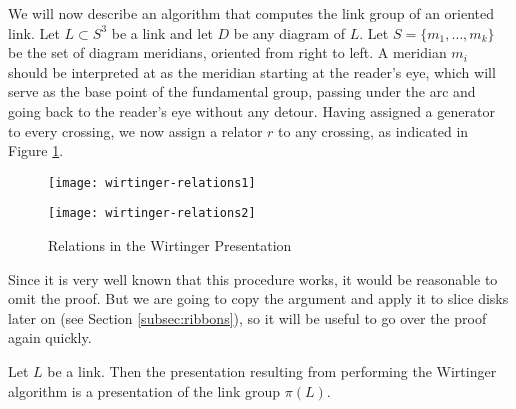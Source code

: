 \documentclass[main.tex]{subfiles}
\begin{document}
We will now describe an algorithm that computes the link group of an oriented link. Let $L \subset S^3$ be a link and let $D$ be any diagram of $L$. Let $S = \{m_1, \dots, m_k\}$ be the set of diagram meridians, oriented from right to left. A meridian $m_i$ should be interpreted at as the meridian starting at the reader's eye, which will serve as the base point of the fundamental group, passing under the arc and going back to the reader's eye without any detour.
Having assigned a generator to every crossing, we now assign a relator $r$ to any crossing, as indicated in Figure \ref{fig:wirtinger-relations}.

\begin{figure}[ht]
\centering
\begin{minipage}{.45\textwidth}
\centering
\texttt{[image: wirtinger-relations1]}
\end{minipage}%
\begin{minipage}{.45\textwidth}
\centering
\texttt{[image: wirtinger-relations2]}
\end{minipage}
\caption{Relations in the Wirtinger Presentation}
\label{fig:wirtinger-relations}
\end{figure}

Since it is very well known that this procedure works, it would be reasonable to omit the proof. But we are going to copy the argument and apply it to slice disks later on (see Section \ref{subsec:ribbons}), so it will be useful to go over the proof again quickly.





\begin{theorem}\label{thm:wirtinger-thm}
Let $L$ be a link.
Then the presentation resulting from performing the Wirtinger algorithm is a presentation of the link group $\pi(L)$.
\end{theorem}
\end{document}
